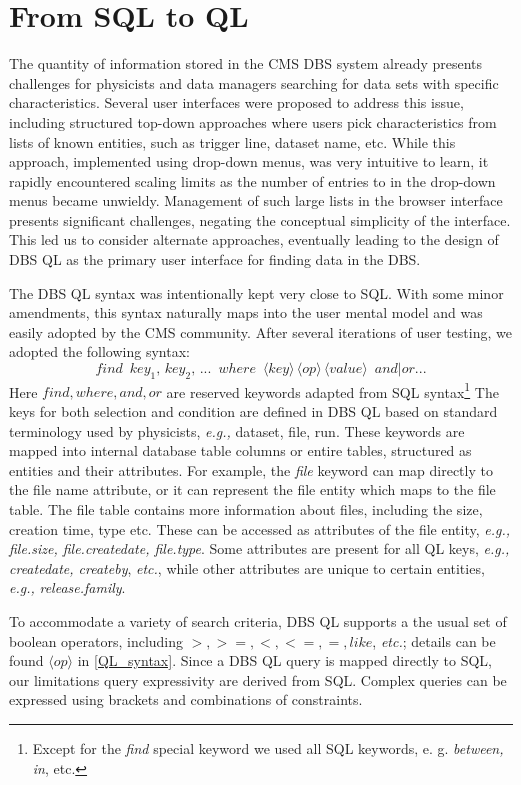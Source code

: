 \documentclass[a4paper]{jpconf}
\begin{document}
\section{From SQL to QL}

The quantity of information stored in the CMS DBS system already
presents challenges for physicists and data managers searching for
data sets with specific characteristics.
Several user interfaces were proposed to address this issue, including
structured top-down approaches where users pick characteristics
from lists of known entities, such as
trigger line, dataset name, etc.
While this approach, implemented using drop-down menus,
was very intuitive to learn,
it rapidly encountered scaling limits as the number of entries to in the drop-down menus
became unwieldy.
Management of such large lists in the browser interface presents significant challenges,
negating the conceptual simplicity of the interface. This led us to consider alternate
approaches, eventually leading to the design of
DBS QL as the primary user interface for finding data in the DBS.

The DBS QL syntax was intentionally kept very close to SQL.  With some minor amendments, this syntax naturally
maps into the user mental model and was easily adopted by the CMS
community. After several iterations of user testing, we adopted the following syntax:
\[
find\,\,\,
key_1,\, key_2,\, ...\,\,\, where\,\,\,
\langle key\rangle\, 
\langle op\rangle\, 
\langle value\rangle \,\,\, and|or ...
\label{QL_syntax}
\]
Here $find, where, and, or$ are reserved keywords
adapted from SQL syntax\footnote{Except for the {\it find} special
keyword we used all SQL keywords, e. g. {\it between, in}, etc.}
The keys for both selection and condition are defined
in DBS QL based on standard terminology used by physicists, {\it e.g.,} dataset, file, run. 
These keywords are mapped into internal database table columns or entire tables,
structured as entities and their attributes. For example,
the {\it file} keyword can map directly to the file name attribute, or it can represent the file
entity which maps to the file table. The file table
contains more information about files, including the size, creation time,
type etc. These can be accessed as attributes of the file entity, {\it e.g.,}
{\it file.size, file.createdate, file.type}. Some attributes
are present for all QL keys, {\it e.g.,} {\it createdate, createby}, {\it etc.},
while other attributes are unique to certain entities, {\it e.g.,} {\it release.family}.

To accommodate a variety of search criteria, DBS QL supports a
the usual set of boolean operators, including $>, >=, <, <=, =, like$, {\it etc.};
details can be found $\langle op\rangle$ in \ref{QL_syntax}.
Since a DBS QL query is mapped directly to SQL, our limitations query expressivity
are derived from SQL.  Complex queries can be expressed using
brackets and combinations of constraints.
\end{document}
